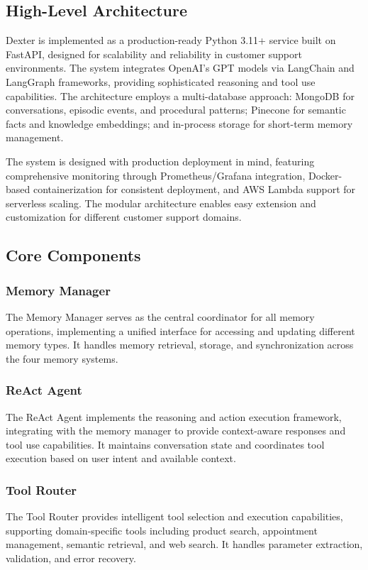 \documentclass[11pt]{article}
\begin{document}
\subsection{High-Level Architecture}

Dexter is implemented as a production-ready Python 3.11+ service built on FastAPI, designed for scalability and reliability in customer support environments. The system integrates OpenAI's GPT models via LangChain and LangGraph frameworks, providing sophisticated reasoning and tool use capabilities. The architecture employs a multi-database approach: MongoDB for conversations, episodic events, and procedural patterns; Pinecone for semantic facts and knowledge embeddings; and in-process storage for short-term memory management.

The system is designed with production deployment in mind, featuring comprehensive monitoring through Prometheus/Grafana integration, Docker-based containerization for consistent deployment, and AWS Lambda support for serverless scaling. The modular architecture enables easy extension and customization for different customer support domains.

\subsection{Core Components}

\subsubsection{Memory Manager}
The Memory Manager serves as the central coordinator for all memory operations, implementing a unified interface for accessing and updating different memory types. It handles memory retrieval, storage, and synchronization across the four memory systems.

\subsubsection{ReAct Agent}
The ReAct Agent implements the reasoning and action execution framework, integrating with the memory manager to provide context-aware responses and tool use capabilities. It maintains conversation state and coordinates tool execution based on user intent and available context.

\subsubsection{Tool Router}
The Tool Router provides intelligent tool selection and execution capabilities, supporting domain-specific tools including product search, appointment management, semantic retrieval, and web search. It handles parameter extraction, validation, and error recovery.
\end{document}
